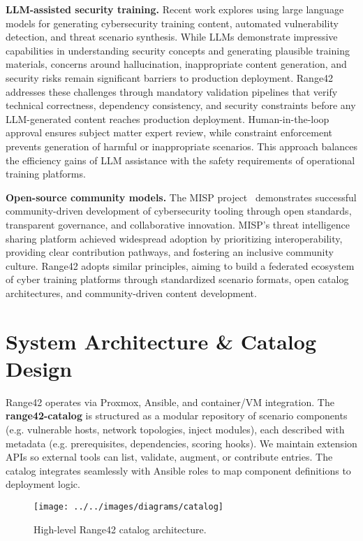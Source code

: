 \documentclass[11pt]{article}
\begin{document}
\textbf{LLM-assisted security training.}
Recent work explores using large language models for generating cybersecurity training content, automated vulnerability detection, and threat scenario synthesis.
While LLMs demonstrate impressive capabilities in understanding security concepts and generating plausible training materials, concerns around hallucination, inappropriate content generation, and security risks remain significant barriers to production deployment.
Range42 addresses these challenges through mandatory validation pipelines that verify technical correctness, dependency consistency, and security constraints before any LLM-generated content reaches production deployment.
Human-in-the-loop approval ensures subject matter expert review, while constraint enforcement prevents generation of harmful or inappropriate scenarios.
This approach balances the efficiency gains of LLM assistance with the safety requirements of operational training platforms.

\textbf{Open-source community models.}
The MISP project~\cite{misp} demonstrates successful community-driven development of cybersecurity tooling through open standards, transparent governance, and collaborative innovation.
MISP's threat intelligence sharing platform achieved widespread adoption by prioritizing interoperability, providing clear contribution pathways, and fostering an inclusive community culture.
Range42 adopts similar principles, aiming to build a federated ecosystem of cyber training platforms through standardized scenario formats, open catalog architectures, and community-driven content development.

\section{System Architecture \& Catalog Design}
Range42 operates via Proxmox, Ansible, and container/VM integration.  
The \textbf{range42-catalog} is structured as a modular repository of scenario components (e.g. vulnerable hosts, network topologies, inject modules), each described with metadata (e.g. prerequisites, dependencies, scoring hooks). We maintain extension APIs so external tools can list, validate, augment, or contribute entries. The catalog integrates seamlessly with Ansible roles to map component definitions to deployment logic.

\begin{figure}[h]
\centering
\texttt{[image: ../../images/diagrams/catalog]}
\caption{High-level Range42 catalog architecture.}
\label{fig:arch_catalog}
\end{figure}
\end{document}
